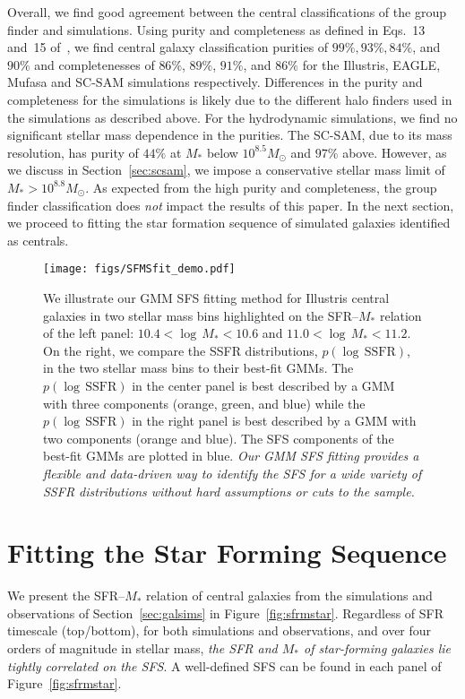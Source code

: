 \documentclass[preprint2,tighten]{aastex62}
\begin{document}
Overall, we find good agreement between the central classifications of 
the group finder and simulations. Using purity and completeness as defined 
in Eqs.~13 and~15 of~\cite{campbell2015}, we find central galaxy classification purities of 
$99\%, 93\%, 84\%$, and $90\%$ and completenesses of $86\%$, $89\%$, 
$91\%$, and $86\%$  for the Illustris, EAGLE, {\sc Mufasa} and SC-SAM 
simulations respectively. Differences in the purity and completeness for the 
simulations is likely due to the different halo finders used in the 
simulations as described above. For the hydrodynamic simulations, we find no 
significant stellar mass dependence in the purities. The SC-SAM, due to 
its mass resolution, has purity of $44\%$ at $M_*$ below $10^{8.5}M_\odot$ 
and $97\%$ above. However, as we discuss in Section~\ref{sec:scsam}, we 
impose a conservative stellar mass limit of $M_* > 10^{8.8} M_\odot$. 
As expected from the high purity and completeness, the group finder 
classification does \emph{not} impact the results of this paper. In 
the next section, we proceed to fitting the star formation sequence 
of simulated galaxies identified as centrals.


\begin{figure*}
\begin{center}
\texttt{[image: figs/SFMSfit\_demo.pdf]} 
\caption{
We illustrate our GMM SFS fitting method for Illustris central galaxies in two 
stellar mass bins highlighted on the SFR--$M_*$ relation of the left panel: 
$10.4 < \log\,M_* < 10.6$ and $11.0 < \log\,M_* < 11.2$. On the right, we compare the SSFR 
distributions, $p(\log\,\mathrm{SSFR})$, in the two stellar 
mass bins to their best-fit GMMs. The $p(\log\,\mathrm{SSFR})$ in the center panel is best described by a 
GMM with three components (orange, green, and blue) while the
$p(\log\,\mathrm{SSFR})$ in the right panel is best described by 
a GMM with two components (orange and blue). The SFS components of the 
best-fit GMMs are plotted in blue. \emph{Our GMM SFS fitting provides
a flexible and data-driven way to identify the SFS for a wide variety 
of SSFR distributions without hard assumptions or cuts to the sample.}
}\label{fig:fitdemo}
\end{center}
\end{figure*}

\section{Fitting the Star Forming Sequence}\label{sec:sfmsfit}
We present the SFR--$M_*$ relation of central galaxies from the 
simulations and observations of Section~\ref{sec:galsims} in 
Figure~\ref{fig:sfrmstar}. Regardless of SFR timescale (top/bottom),
for both simulations and observations, and over four orders of magnitude 
in stellar mass, \emph{the SFR and $M_*$ of star-forming galaxies lie 
tightly correlated on the SFS}. A well-defined SFS can be found in 
each panel of Figure~\ref{fig:sfrmstar}.
\end{document}
